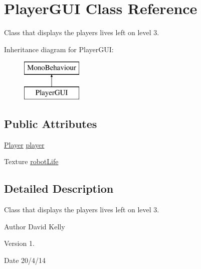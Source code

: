 \hypertarget{class_player_g_u_i}{\section{Player\-G\-U\-I Class Reference}
\label{class_player_g_u_i}
}


Class that displays the players lives left on level 3.  


Inheritance diagram for Player\-G\-U\-I\-:\begin{figure}[H]
\begin{center}
\leavevmode
\includegraphics[height=2.000000cm]{class_player_g_u_i}
\end{center}
\end{figure}
\subsection*{Public Attributes}
\begin{DoxyCompactItemize}
\item 
\hyperlink{class_player}{Player} \hyperlink{class_player_g_u_i_a40c0f7c540fc730e1991db977edbcfb4}{player}
\item 
Texture \hyperlink{class_player_g_u_i_a71b0c8060bfd05c34d73ff6f271fd24b}{robot\-Life}
\end{DoxyCompactItemize}


\subsection{Detailed Description}
Class that displays the players lives left on level 3. 

\begin{DoxyAuthor}{Author}
David Kelly 
\end{DoxyAuthor}
\begin{DoxyVersion}{Version}
1. 
\end{DoxyVersion}
\begin{DoxyDate}{Date}
20/4/14 
\end{DoxyDate}


